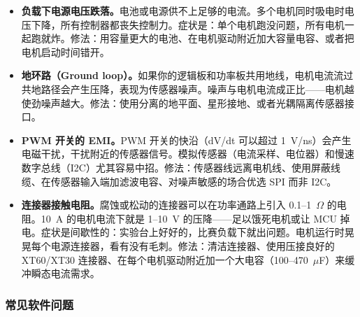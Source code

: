 \begin{itemize}
    \item \textbf{负载下电源电压跌落。}电池或电源供不上足够的电流。多个电机同时吸电时电压下降，所有控制器都丧失控制力。症状是：单个电机跑没问题，所有电机一起跑就炸。修法：用容量更大的电池、在电机驱动附近加大容量电容、或者把电机启动时间错开。

    \item \textbf{地环路（Ground loop）。}如果你的逻辑板和功率板共用地线，电机电流流过共地路径会产生压降，表现为传感器噪声。噪声与电机电流成正比——电机越使劲噪声越大。修法：使用分离的地平面、星形接地、或者光耦隔离传感器接口。

    \item \textbf{PWM 开关的 EMI。}PWM 开关的快沿（dV/dt 可以超过 1~V/ns）会产生电磁干扰，干扰附近的传感器信号。模拟传感器（电流采样、电位器）和慢速数字总线（I2C）尤其容易中招。修法：传感器线远离电机线、使用屏蔽线缆、在传感器输入端加滤波电容、对噪声敏感的场合优选 SPI 而非 I2C。

    \item \textbf{连接器接触电阻。}腐蚀或松动的连接器可以在功率通路上引入 0.1--1~$\Omega$ 的电阻。10~A 的电机电流下就是 1--10~V 的压降——足以饿死电机或让 MCU 掉电。症状是间歇性的：实验台上好好的，比赛负载下就出问题。电机运行时晃晃每个电源连接器，看有没有毛刺。修法：清洁连接器、使用压接良好的 XT60/XT30 连接器、在每个电机驱动附近加一个大电容（100--470~$\mu$F）来缓冲瞬态电流需求。
\end{itemize}

\subsubsection{常见软件问题}

